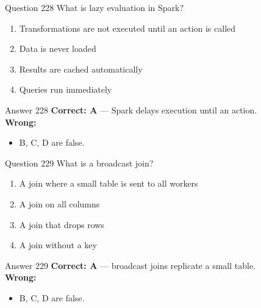 \documentclass[aspectratio=169,11pt]{beamer}
\begin{document}
	\begin{frame}{Question 228}
		What is lazy evaluation in Spark?
		\begin{enumerate}[label=\Alph*.]
			\item Transformations are not executed until an action is called
			\item Data is never loaded
			\item Results are cached automatically
			\item Queries run immediately
		\end{enumerate}
	\end{frame}
	\begin{frame}{Answer 228}
		\textbf{Correct: A} --- Spark delays execution until an action.\\
		\vspace{0.5em}
		\textbf{Wrong:}
		\begin{itemize}
			\item B, C, D are false.
		\end{itemize}
	\end{frame}
	
	\begin{frame}{Question 229}
		What is a broadcast join?
		\begin{enumerate}[label=\Alph*.]
			\item A join where a small table is sent to all workers
			\item A join on all columns
			\item A join that drops rows
			\item A join without a key
		\end{enumerate}
	\end{frame}
	\begin{frame}{Answer 229}
		\textbf{Correct: A} --- broadcast joins replicate a small table.\\
		\vspace{0.5em}
		\textbf{Wrong:}
		\begin{itemize}
			\item B, C, D are false.
		\end{itemize}
	\end{frame}
	
\end{document}
